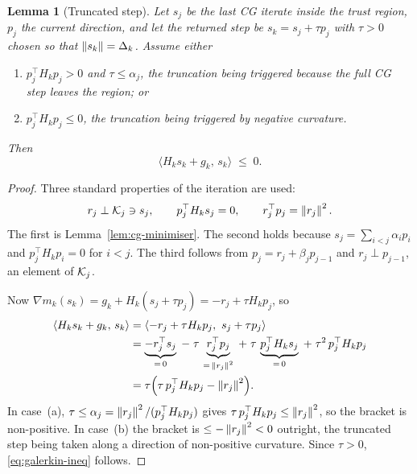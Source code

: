 \documentclass[11pt]{article}
\theoremstyle{plain}
\newtheorem{lemma}[theorem]{Lemma}
\theoremstyle{definition}
\theoremstyle{remark}
\numberwithin{equation}{section}
\begin{document}
\begin{lemma}[Truncated step]
\label{lem:boundary}
    Let $s_j$ be the last CG iterate inside the trust region, $p_j$ the current direction, and let
    the returned step be $s_k = s_j + \tau p_j$ with $\tau > 0$ chosen so that
    $\left \lVert s_k \right \rVert = \Delta_k$. Assume either
    \begin{enumerate}[label=(\alph*),leftmargin=2.2em]
        \item $p_j^\top H_k p_j > 0$ and $\tau \leq \alpha_j$, the truncation being triggered
              because the full CG step leaves the region; or
        \item $p_j^\top H_k p_j \leq 0$, the truncation being triggered by negative curvature.
    \end{enumerate}
    Then
    \begin{equation}
        \langle H_k s_k + g_k,\, s_k \rangle \;\leq\; 0 .
        \label{eq:galerkin-ineq}
    \end{equation}
\end{lemma}

\begin{proof}
    Three standard properties of the iteration are used:
    \begin{equation}
        r_j \perp {\mathcal{K}}_j \ni s_j ,
        \qquad
        p_j^\top H_k s_j = 0 ,
        \qquad
        r_j^\top p_j = \left \lVert r_j \right \rVert^2 .
        \label{eq:three-facts}
    \end{equation}
    The first is Lemma~\ref{lem:cg-minimiser}. The second holds because
    $s_j = \sum_{i<j}\alpha_i p_i$ and $p_j^\top H_k p_i = 0$ for $i < j$. The third follows from
    $p_j = r_j + \beta_j p_{j-1}$ and $r_j \perp p_{j-1}$, an element of ${\mathcal{K}}_j$.

    Now $\nabla m_k(s_k) = g_k + H_k(s_j + \tau p_j) = -r_j + \tau H_k p_j$, so
    \begin{align}
        \langle H_k s_k + g_k,\, s_k\rangle
          &= \langle -r_j + \tau H_k p_j,\ s_j + \tau p_j\rangle \notag\\
          &= \underbrace{-r_j^\top s_j}_{=\,0}
             \;-\; \tau\, \underbrace{r_j^\top p_j}_{=\,\left \lVert r_j \right \rVert^2}
             \;+\; \tau\, \underbrace{p_j^\top H_k s_j}_{=\,0}
             \;+\; \tau^2\, p_j^\top H_k p_j \notag\\
          &= \tau\Bigl( \tau\, p_j^\top H_k p_j - \left \lVert r_j \right \rVert^2 \Bigr) .
        \label{eq:boundary-identity}
    \end{align}
    In case~(a), $\tau \leq \alpha_j = \left \lVert r_j \right \rVert^2/(p_j^\top H_kp_j)$ gives
    $\tau\, p_j^\top H_kp_j \leq \left \lVert r_j \right \rVert^2$, so the bracket is non-positive. In case~(b) the
    bracket is $\leq -\left \lVert r_j \right \rVert^2 < 0$ outright, the truncated step being taken along a direction
    of non-positive curvature. Since $\tau > 0$, \eqref{eq:galerkin-ineq} follows.
\end{proof}
\end{document}
